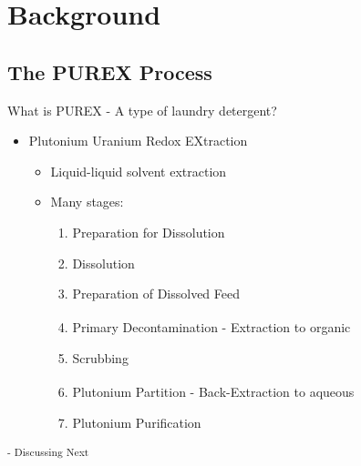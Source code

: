\documentclass{beamer}
\begin{document}
\section{Background}
\begin{frame}
\sectionpage
\end{frame}

\subsection{The PUREX Process}
\begin{frame}{What is PUREX - A type of laundry detergent?}
  \vspace{0.5cm}
  \begin{itemize}
  \item Plutonium Uranium Redox EXtraction 
    \begin{itemize}
    \item Liquid-liquid solvent extraction
    \item Many stages:
      \begin{enumerate}
      \item{Preparation for Dissolution}
      \item{Dissolution}
      \item{Preparation of Dissolved Feed}
      \item{Primary Decontamination - Extraction to
        organic\textsuperscript{\tiny{\AsteriskThin}}}
      \item{Scrubbing}
      \item{Plutonium Partition - Back-Extraction to
        aqueous\textsuperscript{\tiny{\AsteriskThin}}}
      \item{Plutonium Purification}
      \end{enumerate}
    \end{itemize}
  \end{itemize}
  \vspace{1.5cm}
  \textsuperscript{\tiny{\AsteriskThin\hspace{1mm}- Discussing Next}}
\end{frame}
\end{document}
